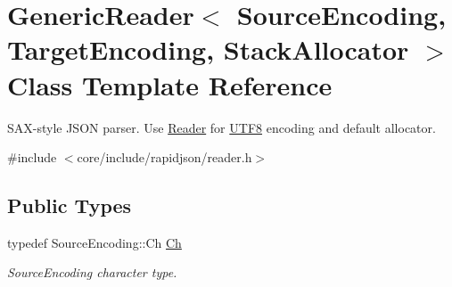 \hypertarget{classGenericReader}{}\section{Generic\+Reader$<$ Source\+Encoding, Target\+Encoding, Stack\+Allocator $>$ Class Template Reference}
\label{classGenericReader}


S\+A\+X-\/style J\+S\+ON parser. Use \hyperlink{reader_8h_a84f3b66a66647f4ac4267078359188ba}{Reader} for \hyperlink{structUTF8}{U\+T\+F8} encoding and default allocator.  




{\ttfamily \#include $<$core/include/rapidjson/reader.\+h$>$}

\subsection*{Public Types}
\begin{DoxyCompactItemize}
\item 
typedef Source\+Encoding\+::\+Ch \hyperlink{classGenericReader_ab39a92bb26d50aee6469df604622218a}{Ch}
\begin{DoxyCompactList}\small\item\em Source\+Encoding character type. \end{DoxyCompactList}\end{DoxyCompactItemize}
